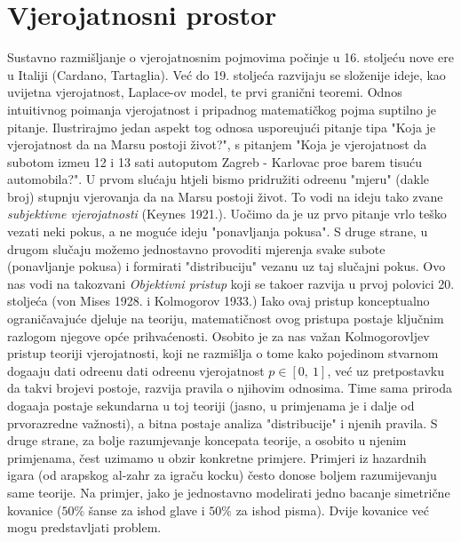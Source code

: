 

\chapter{Vjerojatnosni prostor}

Sustavno razmi\v sljanje o vjerojatnosnim pojmovima po\v cinje u 16.
stolje\' cu nove ere u Italiji (Cardano, Tartaglia). Ve\' c do 19.
stolje\' ca razvijaju se slo\v zenije ideje, kao uvijetna vjerojatnost,
Laplace-ov model, te prvi grani\v cni teoremi. Odnos intuitivnog
poimanja vjerojatnost i pripadnog matemati\v ckog pojma suptilno
je pitanje. Ilustrirajmo jedan aspekt tog odnosa uspore\dj uju\' ci
pitanje tipa "Koja je vjerojatnost da na Marsu postoji \v zivot?",
s pitanjem "Koja je vjerojatnost da subotom izme\dj u 12 i 13 sati
autoputom Zagreb - Karlovac pro\dj e barem tisu\' cu automobila?".
U prvom slu\' caju htjeli bismo pridru\v ziti odre\dj enu "mjeru"
(dakle broj) stupnju vjerovanja da na Marsu postoji \v zivot.
To vodi na ideju tako zvane \emph{subjektivne vjerojatnosti}
(Keynes 1921.). Uo\v cimo da je uz prvo pitanje vrlo te\v sko
vezati neki pokus, a ne mogu\' ce ideju "ponavljanja pokusa".
S druge strane, u drugom slu\v caju mo\v zemo jednostavno provoditi
mjerenja svake subote (ponavljanje pokusa) i formirati "distribuciju"
vezanu uz taj slu\v cajni pokus. Ovo nas vodi na takozvani
\emph{Objektivni pristup} koji se tako\dj er razvija u prvoj polovici
20. stolje\' ca (von Mises 1928. i Kolmogorov 1933.) Iako ovaj
pristup konceptualno ograni\v cavaju\' ce djeluje na teoriju,
matemati\v cnost ovog pristupa postaje klju\v cnim razlogom njegove
op\' ce prihva\' cenosti.
Osobito je za nas va\v zan Kolmogorovljev pristup teoriji
vjerojatnosti, koji ne razmi\v slja o tome kako pojedinom stvarnom
doga\dj aju dati odre\dj enu dati odre\dj enu vjerojatnost
$p \in [0, \: 1]$, ve\' c uz pretpostavku da takvi brojevi postoje,
razvija pravila o njihovim odnosima. Time sama priroda doga\dj aja
postaje sekundarna u toj teoriji (jasno, u primjenama je i dalje od
prvorazredne va\v znosti), a bitna postaje analiza "distribucije"
i njenih pravila.
S druge strane, za bolje razumjevanje koncepata teorije, a osobito
u njenim primjenama, \v cest uzimamo u obzir konkretne primjere.
Primjeri iz hazardnih igara (od arapskog al-zahr za igra\v cu
kocku) \v cesto donose boljem razumijevanju same teorije. Na
primjer, jako je jednostavno modelirati jedno bacanje simetri\v cne
kovanice ($50\%$ \v sanse za ishod glave i $50\%$ za ishod pisma).
Dvije kovanice ve\' c mogu predstavljati problem.

